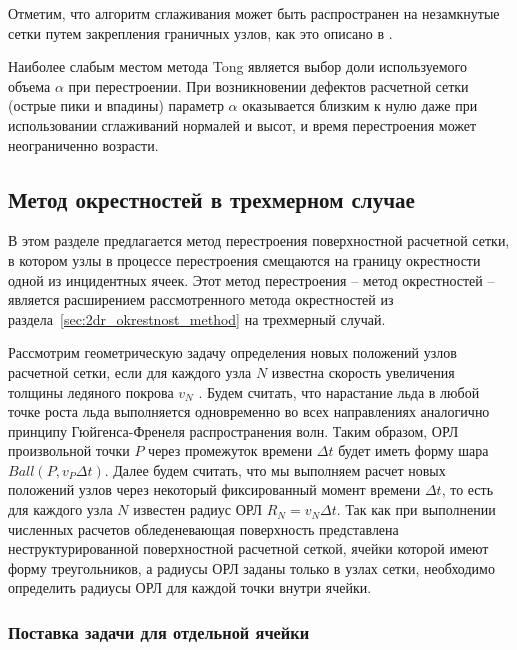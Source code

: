 Отметим, что алгоритм сглаживания может быть распространен на незамкнутые сетки путем закрепления граничных узлов, как это описано в \cite{Shumilin2021Smooth}.

Наиболее слабым местом метода Tong является выбор доли используемого объема $\alpha$ при перестроении.
При возникновении дефектов расчетной сетки (острые пики и впадины) параметр $\alpha$ оказывается близким к нулю даже при использовании сглаживаний нормалей и высот, и время перестроения может неограниченно возрасти.


\subsection{Метод окрестностей в трехмерном случае}

В этом разделе предлагается метод перестроения поверхностной расчетной сетки, в котором узлы в процессе перестроения смещаются на границу окрестности одной из инцидентных ячеек.
Этот метод перестроения -- метод окрестностей -- является расширением рассмотренного метода окрестностей из раздела~\ref{sec:2dr_okrestnost_method} на трехмерный случай.

Рассмотрим геометрическую задачу определения новых положений узлов расчетной сетки, если для каждого узла $N$ известна скорость увеличения толщины ледяного покрова $v_N$ \cite{Rybakov2023GeoRemesh}.
Будем считать, что нарастание льда в любой точке роста льда выполняется одновременно во всех направлениях аналогично принципу Гюйгенса-Френеля распространения волн.
Таким образом, ОРЛ произвольной точки $P$ через промежуток времени $\Delta t$ будет иметь форму шара $Ball(P, v_P \Delta t)$.
Далее будем считать, что мы выполняем расчет новых положений узлов через некоторый фиксированный момент времени $\Delta t$, то есть для каждого узла $N$ известен радиус ОРЛ $R_N = v_N \Delta t$.
Так как при выполнении численных расчетов обледеневающая поверхность представлена неструктурированной поверхностной расчетной сеткой, ячейки которой имеют форму треугольников, а радиусы ОРЛ заданы только в узлах сетки, необходимо определить радиусы ОРЛ для каждой точки внутри ячейки.

\subsubsection{Поставка задачи для отдельной ячейки}

